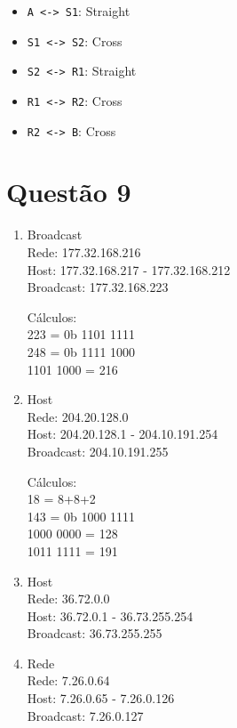\documentclass{article}
\begin{document}
\begin{itemize}
    \item \texttt{A  <-> S1}: Straight
    \item \texttt{S1 <-> S2}: Cross
    \item \texttt{S2 <-> R1}: Straight
    \item \texttt{R1 <-> R2}: Cross
    \item \texttt{R2 <->  B}: Cross
\end{itemize}

\newpage
\section*{Questão 9}

\begin{enumerate}
    \item Broadcast \\
        Rede: 177.32.168.216 \\
        Host: 177.32.168.217 - 177.32.168.212 \\
        Broadcast: 177.32.168.223

    Cálculos: \\
        223 = 0b 1101 1111 \\
        248 = 0b 1111 1000 \\
        1101 1000 = 216

    \item Host \\
        Rede: 204.20.128.0 \\
        Host: 204.20.128.1 - 204.10.191.254  \\
        Broadcast: 204.10.191.255

    Cálculos: \\
        18 = 8+8+2 \\
        143 = 0b 1000 1111 \\
        1000 0000 = 128 \\
        1011 1111 = 191

    \item Host \\
        Rede:  36.72.0.0 \\
        Host:  36.72.0.1 - 36.73.255.254 \\
        Broadcast: 36.73.255.255

    \item Rede \\
        Rede:  7.26.0.64 \\
        Host:  7.26.0.65 - 7.26.0.126 \\
        Broadcast: 7.26.0.127


\end{enumerate}
\end{document}

